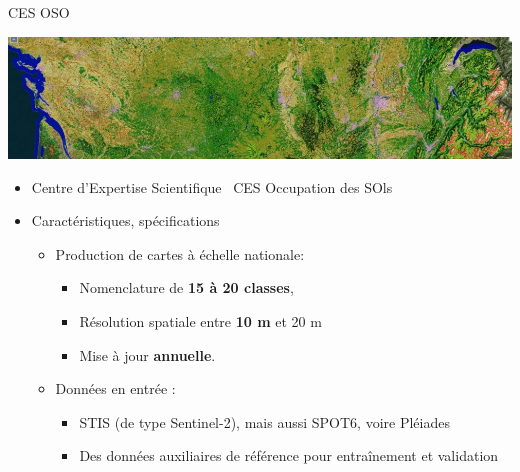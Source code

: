 \documentclass[pressentation,10pt,aspectratio=1610, xcolor=table]{beamer}
\begin{document}
\begin{frame}[label={sec:org0569d29}]{CES OSO}
\begin{center}
\includegraphics[width=0.8\linewidth]{./figures/imagesat_oso.jpg}
\end{center}

\begin{itemize}
\item Centre d'Expertise Scientifique \og~CES Occupation des SOls\fg
\item Caractéristiques, spécifications
\begin{itemize}
\item Production de cartes à échelle nationale:
\begin{itemize}
\item Nomenclature de \textbf{15 à 20 classes},
\item Résolution spatiale entre \textbf{10 m} et 20 m
\item Mise à jour \textbf{annuelle}.
\end{itemize}
\item Données en entrée :
\begin{itemize}
\item STIS (de type Sentinel-2), mais aussi SPOT6, voire Pléiades
\item Des données auxiliaires de référence pour entraînement et validation
\end{itemize}
\end{itemize}
\end{itemize}
\end{frame}
\end{document}
